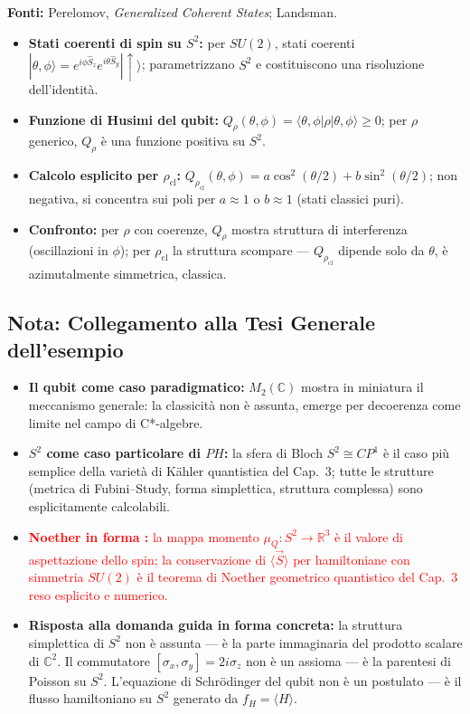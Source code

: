 \documentclass[12pt, a4paper]{article}
\newcommand{\fonti}[1]{%
	\begin{fontebox}
		\textcolor{fontecolor}{\footnotesize\textbf{Fonti:} #1}
	\end{fontebox}%
}
\begin{document}
	\fonti{Perelomov, \textit{Generalized Coherent States}; Landsman.}
	
	\begin{itemize}
		\item \textbf{Stati coerenti di spin su $S^2$:} per $SU(2)$, stati coerenti $|\theta,\phi\rangle = e^{i\phi\hat{S}_z}e^{i\theta\hat{S}_y}|\uparrow\rangle$; parametrizzano $S^2$ e costituiscono una risoluzione dell'identità.
		\item \textbf{Funzione di Husimi del qubit:} $Q_\rho(\theta,\phi) = \langle\theta,\phi|\rho|\theta,\phi\rangle \geq 0$; per $\rho$ generico, $Q_\rho$ è una funzione positiva su $S^2$.
		\item \textbf{Calcolo esplicito per $\rho_{\text{cl}}$:} $Q_{\rho_{\text{cl}}}(\theta,\phi) = a\cos^2(\theta/2) + b\sin^2(\theta/2)$; non negativa, si concentra sui poli per $a \approx 1$ o $b \approx 1$ (stati classici puri).
		\item \textbf{Confronto:} per $\rho$ con coerenze, $Q_\rho$ mostra struttura di interferenza (oscillazioni in $\phi$); per $\rho_{\text{cl}}$ la struttura scompare --- $Q_{\rho_{\text{cl}}}$ dipende solo da $\theta$, è azimutalmente simmetrica, classica.
	\end{itemize}
	
	\subsection*{Nota: Collegamento alla Tesi Generale dell'esempio}
	
	\begin{itemize}
		\item \textbf{Il qubit come caso paradigmatico:} $M_2(\mathbb{C})$ mostra in miniatura il meccanismo generale: la classicità non è assunta, emerge per decoerenza come limite nel campo di C*-algebre.
		\item \textbf{$S^2$ come caso particolare di $PH$:} la sfera di Bloch $S^2 \cong CP^1$ è il caso più semplice della varietà di Kähler quantistica del Cap.~3; tutte le strutture (metrica di Fubini--Study, forma simplettica, struttura complessa) sono esplicitamente calcolabili.
		\item \textcolor{red}{\textbf{Noether in forma :} la mappa momento $\mu_Q: S^2 \to \mathbb{R}^3$ è il valore di aspettazione dello spin; la conservazione di $\langle\vec{S}\rangle$ per hamiltoniane con simmetria $SU(2)$ è il teorema di Noether geometrico quantistico del Cap.~3 reso esplicito e numerico.}
		\item \textbf{Risposta alla domanda guida in forma concreta:} la struttura simplettica di $S^2$ non è assunta --- è la parte immaginaria del prodotto scalare di $\mathbb{C}^2$. Il commutatore $[\sigma_x,\sigma_y]=2i\sigma_z$ non è un assioma --- è la parentesi di Poisson su $S^2$. L'equazione di Schrödinger del qubit non è un postulato --- è il flusso hamiltoniano su $S^2$ generato da $f_H = \langle H\rangle$.
	\end{itemize}
	
\end{document}
